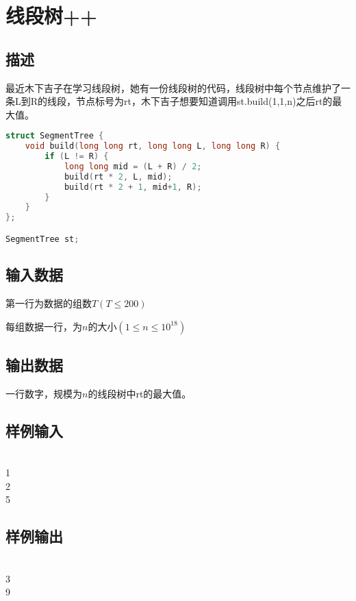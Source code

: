 \ifx\allfiles\undefined

\fi


\section{线段树++}
\subsection*{描述}
最近木下吉子在学习线段树，她有一份线段树的代码，线段树中每个节点维护了一条L到R的线段，节点标号为rt，木下吉子想要知道调用st.build(1,1,n)之后rt的最大值。
\begin{lstlisting}[language=C++]
struct SegmentTree {
	void build(long long rt, long long L, long long R) {
		if (L != R) {
			long long mid = (L + R) / 2;
			build(rt * 2, L, mid);
			build(rt * 2 + 1, mid+1, R);
		}
	}
};

SegmentTree st;
\end{lstlisting} 

\subsection*{输入数据}
第一行为数据的组数$T(T\leqslant 200)$

每组数据一行，为$n$的大小$(1\leqslant n\leqslant 10^{18})$

\subsection*{输出数据}
一行数字，规模为$n$的线段树中rt的最大值。


\subsection*{样例输入}
\\
1\\
2\\
5


\subsection*{样例输出}
\\
3\\
9


\ifx\allfiles\undefined

\fi